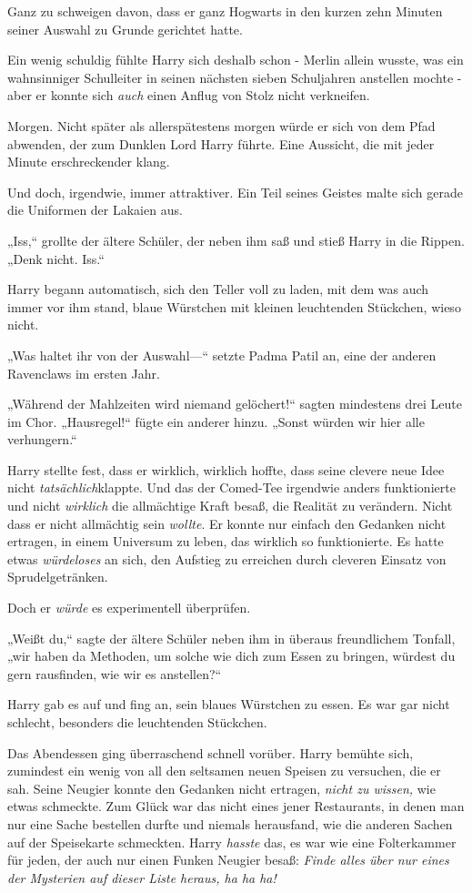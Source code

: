 {Ganz zu schweigen davon, dass er ganz Hogwarts in den kurzen zehn Minuten seiner Auswahl zu Grunde gerichtet hatte.

Ein wenig schuldig fühlte Harry sich deshalb schon - Merlin allein wusste, was ein wahnsinniger Schulleiter in seinen nächsten sieben Schuljahren anstellen mochte - aber er konnte sich \emph{auch} einen Anflug von Stolz nicht verkneifen.

Morgen. Nicht später als allerspätestens morgen würde er sich von dem Pfad abwenden, der zum Dunklen Lord Harry führte. Eine Aussicht, die mit jeder Minute erschreckender klang.

Und doch, irgendwie, immer attraktiver. Ein Teil seines Geistes malte sich gerade die Uniformen der Lakaien aus.

„Iss,“ grollte der ältere Schüler, der neben ihm saß und stieß Harry in die Rippen. „Denk nicht. Iss.“

Harry begann automatisch, sich den Teller voll zu laden, mit dem was auch immer vor ihm stand, blaue Würstchen mit kleinen leuchtenden Stückchen, wieso nicht.

„Was haltet ihr von der Auswahl—“ setzte Padma Patil an, eine der anderen Ravenclaws im ersten Jahr.

„Während der Mahlzeiten wird niemand gelöchert!“ sagten mindestens drei Leute im Chor. „Hausregel!“ fügte ein anderer hinzu. „Sonst würden wir hier alle verhungern.“

Harry stellte fest, dass er wirklich, wirklich hoffte, dass seine clevere neue Idee nicht \emph{tatsächlich}klappte. Und das der Comed-Tee irgendwie anders funktionierte und nicht \emph{wirklich} die allmächtige Kraft besaß, die Realität zu verändern. Nicht dass er nicht allmächtig sein \emph{wollte}. Er konnte nur einfach den Gedanken nicht ertragen, in einem Universum zu leben, das wirklich so funktionierte. Es hatte etwas \emph{würdeloses} an sich, den Aufstieg zu erreichen durch cleveren Einsatz von Sprudelgetränken.

Doch er \emph{würde} es experimentell überprüfen.

„Weißt du,“ sagte der ältere Schüler neben ihm in überaus freundlichem Tonfall, „wir haben da Methoden, um solche wie dich zum Essen zu bringen, würdest du gern rausfinden, wie wir es anstellen?“

Harry gab es auf und fing an, sein blaues Würstchen zu essen. Es war gar nicht schlecht, besonders die leuchtenden Stückchen.

Das Abendessen ging überraschend schnell vorüber. Harry bemühte sich, zumindest ein wenig von all den seltsamen neuen Speisen zu versuchen, die er sah. Seine Neugier konnte den Gedanken nicht ertragen, \emph{nicht zu wissen,} wie etwas schmeckte. Zum Glück war das nicht eines jener Restaurants, in denen man nur eine Sache bestellen durfte und niemals herausfand, wie die anderen Sachen auf der Speisekarte schmeckten. Harry \emph{hasste} das, es war wie eine Folterkammer für jeden, der auch nur einen Funken Neugier besaß: \emph{Finde alles über nur eines der Mysterien auf dieser Liste heraus, ha ha ha!}

}
